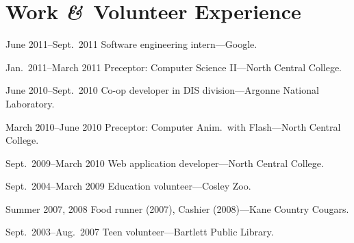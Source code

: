 \documentclass[11pt]{simplecv}
\newcommand*\amp{{\fertigopro\itshape\&}}
\newcommand*\nbds[1][-]{\nobreakdashes#1\hspace{0pt}}
\begin{document}
  \section{Work \amp\ Volunteer Experience}
  \begin{topic}
    \item[June 2011--Sept.\ 2011] Software engineering intern---Google.
    \item[Jan.\ 2011--March 2011] Preceptor: Computer Science II---North Central College.
    \item[June 2010--Sept.\ 2010] Co\nbds op developer in DIS division---Argonne National Laboratory.
    \item[March 2010--June 2010] Preceptor: Computer Anim.\ with Flash---North Central College.
    \item[Sept.\ 2009--March 2010] Web application developer---North Central College.
    \item[Sept.\ 2004--March 2009] Education volunteer---Cosley Zoo.
    \item[Summer 2007, 2008] Food runner (2007), Cashier (2008)---Kane Country Cougars.
    \item[Sept.\ 2003--Aug.\ 2007] Teen volunteer---Bartlett Public Library.
  \end{topic}
\end{document}

